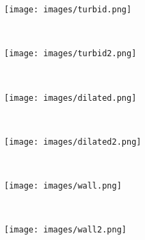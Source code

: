 \documentclass[review,12pt,3p]{elsarticle}
\begin{document}
\begin{figure}
        \begin{subfigure}[b]{0.08\textwidth}
                \texttt{[image: images/turbid.png]}
                \caption{}
        \end{subfigure}%
        ~
        \begin{subfigure}[b]{0.08\textwidth}
                \texttt{[image: images/turbid2.png]}
                \caption{}
        \end{subfigure}
        ~
        \begin{subfigure}[b]{0.08\textwidth}
                \texttt{[image: images/dilated.png]}
                \caption{}
        \end{subfigure}
        ~
        \begin{subfigure}[b]{0.08\textwidth}
                \texttt{[image: images/dilated2.png]}
                \caption{}
        \end{subfigure}
        ~
        \begin{subfigure}[b]{0.08\textwidth}
                \texttt{[image: images/wall.png]}
                \caption{}
        \end{subfigure}
        ~
        \begin{subfigure}[b]{0.08\textwidth}
                \texttt{[image: images/wall2.png]}
                \caption{}
        \end{subfigure}


\end{figure}
\end{document}
